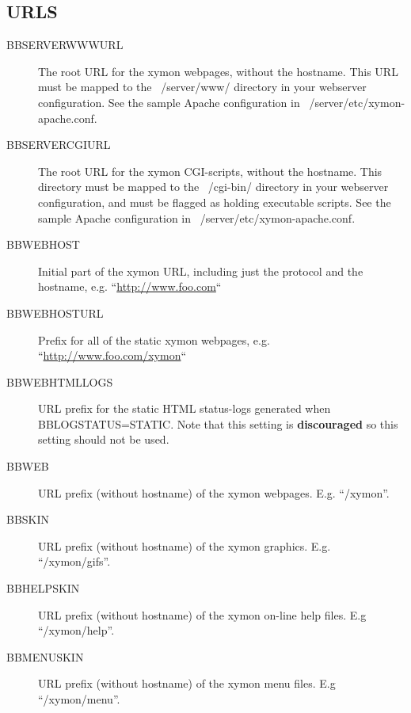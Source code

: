 \subsection{URLS}
\begin{description}
\item[BBSERVERWWWURL] The root URL for the xymon webpages, without the hostname. This URL must be mapped to the ~/server/www/ directory in your webserver configuration. See the sample Apache configuration in ~/server/etc/xymon-apache.conf. 

 

\item[BBSERVERCGIURL] The root URL for the xymon CGI-scripts, without the hostname. This directory must be mapped to the ~/cgi-bin/ directory in your webserver configuration, and must be flagged as holding executable scripts. See the sample Apache configuration in ~/server/etc/xymon-apache.conf. 

 

\item[BBWEBHOST] Initial part of the xymon URL, including just the protocol and the hostname, e.g. ``\url{http://www.foo.com}`` 

 

\item[BBWEBHOSTURL] Prefix for all of the static xymon webpages, e.g. ``\url{http://www.foo.com/xymon}`` 

 

\item[BBWEBHTMLLOGS] URL prefix for the static HTML status-logs generated when BBLOGSTATUS=STATIC. Note that this setting is \textbf{discouraged}
 so this setting should not be used. 

 

\item[BBWEB] URL prefix (without hostname) of the xymon webpages. E.g. ``/xymon''. 

 

\item[BBSKIN] URL prefix (without hostname) of the xymon graphics. E.g. ``/xymon/gifs''. 

 

\item[BBHELPSKIN] URL prefix (without hostname) of the xymon on-line help files. E.g ``/xymon/help''. 

 

\item[BBMENUSKIN] URL prefix (without hostname) of the xymon menu files. E.g ``/xymon/menu''. 


\end{description}
